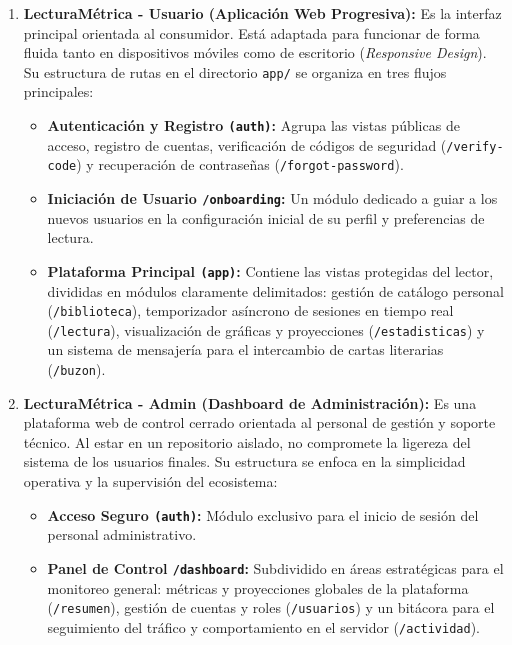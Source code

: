\documentclass[12pt, atypical, journal]{article}
\begin{document}
\begin{enumerate}
    \item \textbf{LecturaMétrica - Usuario (Aplicación Web Progresiva):}
    Es la interfaz principal orientada al consumidor. Está adaptada para funcionar de forma fluida tanto en dispositivos móviles como de escritorio (\textit{Responsive Design}). Su estructura de rutas en el directorio \texttt{app/} se organiza en tres flujos principales:
    \begin{itemize}
        \item \textbf{Autenticación y Registro \texttt{(auth)}:} Agrupa las vistas públicas de acceso, registro de cuentas, verificación de códigos de seguridad (\texttt{/verify-code}) y recuperación de contraseñas (\texttt{/forgot-password}).
        \item \textbf{Iniciación de Usuario \texttt{/onboarding}:} Un módulo dedicado a guiar a los nuevos usuarios en la configuración inicial de su perfil y preferencias de lectura.
        \item \textbf{Plataforma Principal \texttt{(app)}:} Contiene las vistas protegidas del lector, divididas en módulos claramente delimitados: gestión de catálogo personal (\texttt{/biblioteca}), temporizador asíncrono de sesiones en tiempo real (\texttt{/lectura}), visualización de gráficas y proyecciones (\texttt{/estadisticas}) y un sistema de mensajería para el intercambio de cartas literarias (\texttt{/buzon}).
    \end{itemize}
    
    \item \textbf{LecturaMétrica - Admin (Dashboard de Administración):}
    Es una plataforma web de control cerrado orientada al personal de gestión y soporte técnico. Al estar en un repositorio aislado, no compromete la ligereza del sistema de los usuarios finales. Su estructura se enfoca en la simplicidad operativa y la supervisión del ecosistema:
    \begin{itemize}
        \item \textbf{Acceso Seguro \texttt{(auth)}:} Módulo exclusivo para el inicio de sesión del personal administrativo.
        \item \textbf{Panel de Control \texttt{/dashboard}:} Subdividido en áreas estratégicas para el monitoreo general: métricas y proyecciones globales de la plataforma (\texttt{/resumen}), gestión de cuentas y roles (\texttt{/usuarios}) y un bitácora para el seguimiento del tráfico y comportamiento en el servidor (\texttt{/actividad}).
    \end{itemize}
\end{enumerate}
\end{document}

